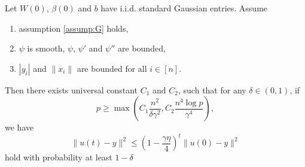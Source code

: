 \begin{theorem}
\label{thm:nonliner_conv}
Let $W(0)$, $\beta(0)$ and $b$ have i.i.d. standard Gaussian entries. Assume
\begin{enumerate}
    \item assumption \ref{assump:G} holds,
    \item $\psi$ is smooth, $\psi$, $\psi'$ and $\psi''$ are bounded,
    \item $|y_i|$ and $\|x_i\|$ are bounded for all $i\in[n]$.
\end{enumerate}
Then there exists universal constant $C_1$ and $C_2$, such that for any $\delta\in(0,1)$, if 
\begin{equation}
    p \geq \max(C_1\frac{n^2}{\delta\gamma^2}, C_2\frac{n^4\log p}{\gamma^4}),
\end{equation}
we have
\begin{equation}
\label{eq:conv}
    \|u(t)-y\|^2 \leq (1-\frac{\gamma\eta}{4})^t\|u(0)-y\|^2
\end{equation}
hold with probability at least $1-\delta$
\end{theorem}

